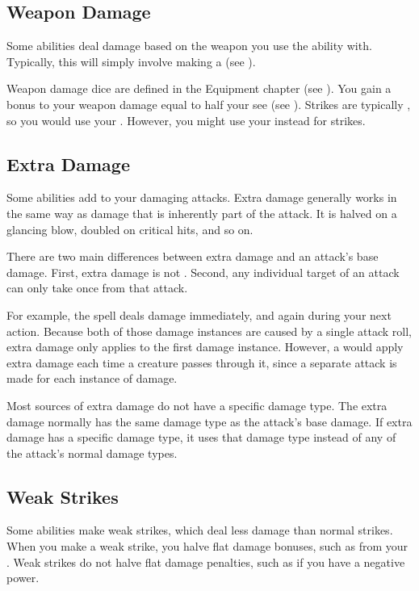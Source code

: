     \subsection{Weapon Damage}\label{Weapon Damage}
        Some abilities deal damage based on the weapon you use the ability with.
        Typically, this will simply involve making a  (see ).

        Weapon damage dice are defined in the Equipment chapter (see ).
        You gain a bonus to your weapon damage equal to half your  see (see ).
        Strikes are typically , so you would use your .
        However, you might use your  instead for \magical strikes.

    \subsection{Extra Damage}\label{Extra Damage}
        Some abilities add  to your damaging attacks.
        Extra damage generally works in the same way as damage that is inherently part of the attack.
        It is halved on a glancing blow, doubled on critical hits, and so on.

        There are two main differences between extra damage and an attack's base damage.
        First, extra damage is not .
        Second, any individual target of an attack can only take  once from that attack.

        For example, the  spell deals damage immediately, and again during your next action.
        Because both of those damage instances are caused by a single attack roll, extra damage only applies to the first damage instance.
        However, a  would apply extra damage each time a creature passes through it, since a separate attack is made for each instance of damage.

        Most sources of extra damage do not have a specific damage type.
        The extra damage normally has the same damage type as the attack's base damage.
        If extra damage has a specific damage type, it uses that damage type instead of any of the attack's normal damage types.

    \subsection{Weak Strikes}
        Some abilities make weak strikes, which deal less damage than normal strikes.
        When you make a weak strike, you halve flat damage bonuses, such as from your .
        Weak strikes do not halve flat damage penalties, such as if you have a negative power.

